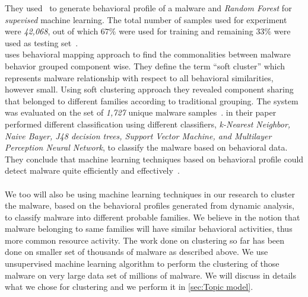 They used~\cite[Cuckoo]{cuckoo} to generate behavioral profile of a malware and \emph{Random Forest} for \emph{supevised} machine learning.
The total number of samples used for experiment were \emph{42,068}, out of which $67\%$ were used for training and remaining $33\%$ were used as testing set~\cite[]{pirscoveanu}.\\
\citeauthor{yavvari} uses behavioral mapping approach to find the commonalities between malware behavior grouped component wise.
They define the term ``soft cluster'' which represents malware relationship with respect to all behavioral similarities, however small.
Using soft clustering approach they revealed component sharing that belonged to different families according to traditional grouping.
The system was evaluated on the set of \emph{1,727} unique malware samples~\cite[]{yavvari}.
\citeauthor{firdausi} in their paper performed different classification using different classifiers, \emph{k-Nearest Neighbor, Naive Bayer, J48 decision trees, Support Vector Machine, and Multilayer Perception Neural Network}, to classify the malware based on behavioral data.
They conclude that machine learning techniques based on behavioral profile could detect malware quite efficiently and effectively~\cite[]{firdausi}.\\
\\
We too will also be using machine learning techniques in our research to cluster the malware, based on the behavioral profiles generated from dynamic analysis, to classify malware into different probable families.
We believe in the notion that malware belonging to same families will have similar behavioral activities, thus more common resource activity.
The work done on clustering so far has been done on smaller set of thousands of malware as described above.
We use unsupervised machine learning algorithm to perform the clustering of those malware on very large data set of millions of malware.
We will discuss in details what we chose for clustering and we perform it in \autoref{sec:Topic model}.
